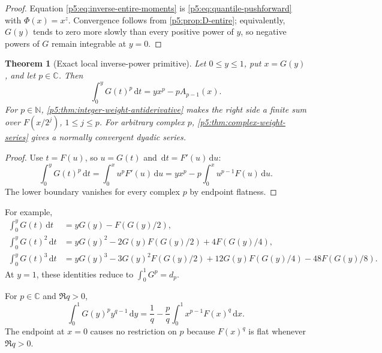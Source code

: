 \documentclass[11pt,oneside]{article}
\newtheorem{theorem}{Theorem}[section]
\theoremstyle{definition}
\theoremstyle{remark}
\newcommand{\C}{\mathbb C}
\newcommand{\N}{\mathbb N}
\newcommand{\dd}{\,\mathrm d}
\newcommand{\1}{\mathbf 1}
\begin{document}
\begin{proof}
Equation \eqref{p5:eq:inverse-entire-moments} is \eqref{p5:eq:quantile-pushforward} with $\Phi(x)=x^z$.  Convergence follows from \cref{p5:prop:D-entire}; equivalently, $G(y)$ tends to zero more slowly than every positive power of $y$, so negative powers of $G$ remain integrable at $y=0$.
\end{proof}

\begin{theorem}[Exact local inverse-power primitive]\label{p5:thm:inverse-local-primitive}
Let $0\le y\le1$, put $x=G(y)$, and let $p\in\C$.  Then
\begin{equation}\label{p5:eq:inverse-local-primitive}
\boxed{
 \int_0^yG(t)^p\dd t
 =y x^p-pA_{p-1}(x).}
\end{equation}
For $p\in\N$, \cref{p5:thm:integer-weight-antiderivative} makes the right side a finite sum over $F(x/2^j)$, $1\le j\le p$.  For arbitrary complex $p$, \cref{p5:thm:complex-weight-series} gives a normally convergent dyadic series.
\end{theorem}

\begin{proof}
Use $t=F(u)$, so $u=G(t)$ and $\dd t=F'(u)\dd u$:
\[
 \int_0^yG(t)^p\dd t
 =\int_0^xu^pF'(u)\dd u
 =yx^p-p\int_0^xu^{p-1}F(u)\dd u.
\]
The lower boundary vanishes for every complex $p$ by endpoint flatness.
\end{proof}

For example,
\begin{align}
 \int_0^yG(t)\dd t
 &=yG(y)-F(G(y)/2),\label{p5:eq:inverse-primitive-p1}\\
 \int_0^yG(t)^2\dd t
 &=yG(y)^2-2G(y)F(G(y)/2)+4F(G(y)/4),\label{p5:eq:inverse-primitive-p2}\\
 \int_0^yG(t)^3\dd t
 &=yG(y)^3-3G(y)^2F(G(y)/2)
 +12G(y)F(G(y)/4)-48F(G(y)/8).
\end{align}
At $y=1$, these identities reduce to $\int_0^1G^p=d_p$.

\begin{corollary}\label{p5:cor:weighted-quantile-duality}
For $p\in\C$ and $\Re q>0$,
\begin{equation}\label{p5:eq:weighted-quantile-duality}
 \int_0^1G(y)^p y^{q-1}\dd y
 =\frac1q-\frac pq\int_0^1x^{p-1}F(x)^q\dd x.
\end{equation}
The endpoint at $x=0$ causes no restriction on $p$ because $F(x)^q$ is flat whenever $\Re q>0$.
\end{corollary}
\end{document}

